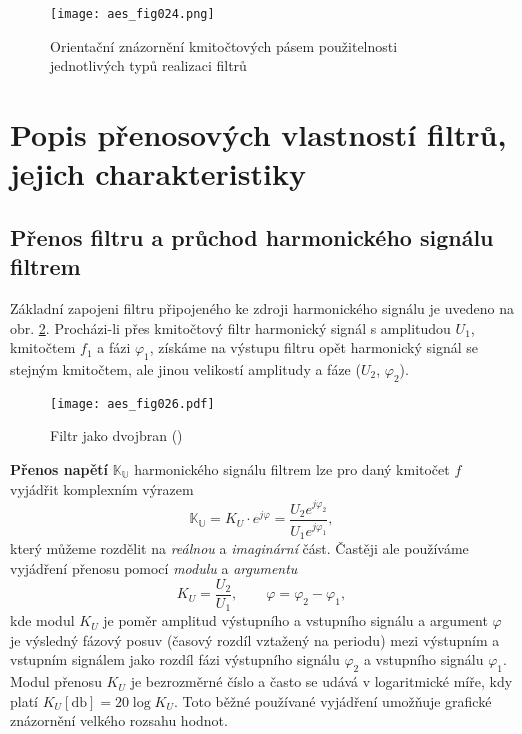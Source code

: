       \begin{figure}[ht!]
        \centering
        \texttt{[image: aes\_fig024.png]}
        \caption{Orientační znázornění kmitočtových pásem použitelnosti jednotlivých typů realizaci
                 filtrů}
        \label{aes:fig024}    
      \end{figure} 

  \section{Popis přenosových vlastností filtrů, jejich charakteristiky}
    \subsection{Přenos filtru a průchod harmonického signálu filtrem}
      Základní zapojeni filtru připojeného ke zdroji harmonického signálu je uvedeno na obr.
      \ref{aes:fig026}. Procházi-li přes kmitočtový filtr harmonický signál s amplitudou \(U_1\),
      kmitočtem \(f_1\) a fázi \(\varphi_1\), získáme na výstupu filtru opět harmonický signál se
      stejným kmitočtem, ale jinou velikostí amplitudy a fáze (\(U_2\), \(\varphi_2\)).
  
      \begin{figure}[ht!]
        \centering
        \texttt{[image: aes\_fig026.pdf]}
        \caption{Filtr jako dvojbran (\cite[s.~25]{HajekSedlacek2002})}
        \label{aes:fig026}    
      \end{figure}
      
      \textbf{Přenos napětí} \(\mathbb{K_U}\) harmonického signálu filtrem lze pro daný kmitočet
      \(f\) vyjádřit komplexním výrazem
      \begin{equation*}
        \mathbb{K_U} = K_U\cdot e^{j\varphi} = \frac{U_2e^{j\varphi_2}}{U_1e^{j\varphi_1}},
      \end{equation*}
      který můžeme rozdělit na \emph{reálnou} a \emph{imaginární} část. Častěji ale používáme
      vyjádření přenosu pomocí \emph{modulu} a \emph{argumentu}
      \begin{equation*}
        K_U = \frac{U_2}{U_1}, \qquad \varphi = \varphi_2 - \varphi_1, 
      \end{equation*}
      kde modul \(K_U\) je poměr amplitud výstupního a vstupního signálu a argument \(\varphi\) je
      výsledný fázový posuv (časový rozdíl vztažený na periodu) mezi výstupním a vstupním signálem
      jako rozdíl fázi výstupního signálu \(\varphi_2\) a vstupního signálu \(\varphi_1\). Modul
      přenosu \(K_U\) je bezrozměrné číslo a často se udává v logaritmické míře, kdy platí \(K_U
      [\si{\decibel}] = 20 \log{K_U}\). Toto běžné používané vyjádření umožňuje grafické znázornění
      velkého rozsahu hodnot.

